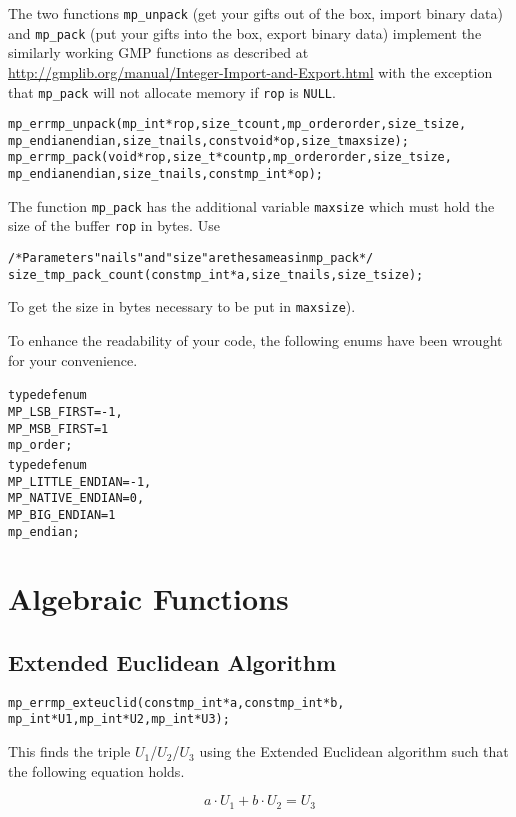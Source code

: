 \documentclass[synpaper]{book}
\begin{document}
The two functions \texttt{mp\_unpack} (get your gifts out of the box, import binary data) and \texttt{mp\_pack} (put your gifts into the box, export binary data) implement the similarly working GMP functions as described at \url{http://gmplib.org/manual/Integer-Import-and-Export.html} with the exception that \texttt{mp\_pack} will not allocate memory if \texttt{rop} is \texttt{NULL}.
 
\begin{alltt}
mp_err mp_unpack(mp_int *rop, size_t count, mp_order order, size_t size,
             mp_endian endian, size_t nails, const void *op, size_t maxsize);
mp_err mp_pack(void *rop, size_t *countp, mp_order order, size_t size,
             mp_endian endian, size_t nails, const mp_int *op);
\end{alltt}
The function \texttt{mp\_pack} has the additional variable \texttt{maxsize} which must hold the size of the buffer \texttt{rop} in bytes. Use
\begin{alltt}
/* Parameters "nails" and "size" are the same as in mp_pack */
size_t mp_pack_count(const mp_int *a, size_t nails, size_t size);
\end{alltt}
To get the size in bytes necessary to be put in \texttt{maxsize}).

To enhance the readability of your code, the following enums have been wrought for your convenience.
\begin{alltt}
typedef enum {
   MP_LSB_FIRST = -1,
   MP_MSB_FIRST =  1
} mp_order;
typedef enum {
   MP_LITTLE_ENDIAN  = -1,
   MP_NATIVE_ENDIAN  =  0,
   MP_BIG_ENDIAN     =  1
} mp_endian;
\end{alltt}

\chapter{Algebraic Functions}
\section{Extended Euclidean Algorithm}
\begin{alltt}
mp_err mp_exteuclid(const mp_int *a, const mp_int *b,
                 mp_int *U1, mp_int *U2, mp_int *U3);
\end{alltt}

This finds the triple $U_1$/$U_2$/$U_3$ using the Extended Euclidean algorithm such that the following equation holds.

\begin{equation}
a \cdot U_1 + b \cdot U_2 = U_3
\end{equation}
\end{document}
